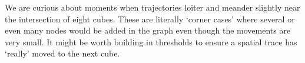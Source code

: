 We are curious about moments when trajectories loiter and meander slightly near the intersection of eight cubes.
These are literally `corner cases' where several or even many nodes would be added in the graph even though the movements are very small.
It might be worth building in thresholds to ensure a spatial trace has `really' moved to the next cube.



